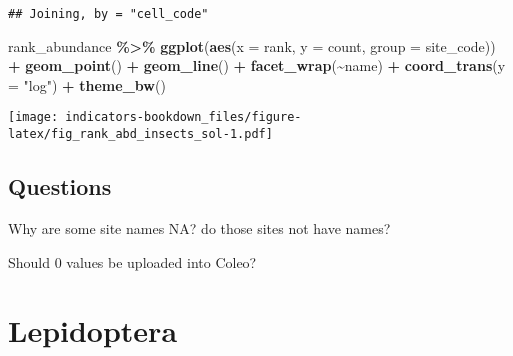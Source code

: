 \documentclass[
]{book}
\newenvironment{Shaded}{\begin{snugshade}}{\end{snugshade}}
\newcommand{\CommentTok}[1]{\textcolor[rgb]{0.56,0.35,0.01}{\textit{#1}}}
\newcommand{\DataTypeTok}[1]{\textcolor[rgb]{0.13,0.29,0.53}{#1}}
\newcommand{\KeywordTok}[1]{\textcolor[rgb]{0.13,0.29,0.53}{\textbf{#1}}}
\newcommand{\NormalTok}[1]{#1}
\newcommand{\OperatorTok}[1]{\textcolor[rgb]{0.81,0.36,0.00}{\textbf{#1}}}
\newcommand{\StringTok}[1]{\textcolor[rgb]{0.31,0.60,0.02}{#1}}
\begin{document}
\begin{verbatim}
## Joining, by = "cell_code"
\end{verbatim}

\begin{Shaded}
\begin{Highlighting}[]
\NormalTok{rank\_abundance }\OperatorTok{\%\textgreater{}\%}\StringTok{ }
\StringTok{  }\KeywordTok{ggplot}\NormalTok{(}\KeywordTok{aes}\NormalTok{(}\DataTypeTok{x =}\NormalTok{ rank, }\DataTypeTok{y =}\NormalTok{ count, }\DataTypeTok{group =}\NormalTok{ site\_code)) }\OperatorTok{+}\StringTok{ }
\StringTok{  }\KeywordTok{geom\_point}\NormalTok{() }\OperatorTok{+}\StringTok{ }
\StringTok{  }\KeywordTok{geom\_line}\NormalTok{() }\OperatorTok{+}\StringTok{ }
\StringTok{  }\KeywordTok{facet\_wrap}\NormalTok{(}\OperatorTok{\textasciitilde{}}\NormalTok{name) }\OperatorTok{+}\StringTok{ }
\StringTok{  }\KeywordTok{coord\_trans}\NormalTok{(}\DataTypeTok{y =} \StringTok{"log"}\NormalTok{) }\OperatorTok{+}\StringTok{ }
\StringTok{  }\KeywordTok{theme\_bw}\NormalTok{()}
\end{Highlighting}
\end{Shaded}

\texttt{[image: indicators-bookdown\_files/figure-latex/fig\_rank\_abd\_insects\_sol-1.pdf]}

\hypertarget{questions-1}{%
\section{Questions}\label{questions-1}}

Why are some site names NA? do those sites not have names?

Should 0 values be uploaded into Coleo?

\hypertarget{lepidoptera}{%
\chapter{Lepidoptera}\label{lepidoptera}}

\begin{Shaded}
\end{Shaded}
\end{document}
